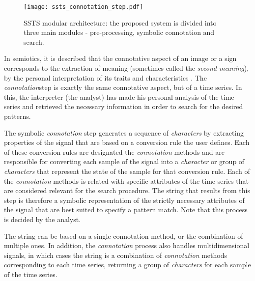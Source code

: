 \begin{figure}
\centering
\texttt{[image: ssts\_connotation\_step.pdf]}
\label{fig:ssts_intro}
\caption{SSTS modular architecture: the proposed system is divided into three main modules - pre-processing, symbolic connotation and search.}
\end{figure}

In semiotics, it is described that the connotative aspect of an image or a sign corresponds to the extraction of meaning (sometimes called the \textit{second meaning}), by the personal interpretation of its traits and characteristics \cite{connotation}. The \textit{connotation}step is exactly the same connotative aspect, but of a time series. In this, the interpreter (the analyst) has made his personal analysis of the time series and retrieved the necessary information in order to search for the desired patterns. 
\par
The symbolic \textit{connotation} step generates a sequence of \textit{characters} by extracting properties of the signal that are based on a conversion rule the user defines. Each of these conversion rules are designated the \textit{connotation} methods and are responsible for converting each sample of the signal into a \textit{character} or group of \textit{characters} that represent the state of the sample for that conversion rule. Each of the \textit{connotation} methods is related with specific attributes of the time series that are considered relevant for the search procedure. The string that results from this step is therefore a symbolic representation of the strictly necessary attributes of the signal that are best suited to specify a pattern match. Note that this process is decided by the analyst.
\par
The string can be based on a single connotation method, or the combination of multiple ones. In addition, the \textit{connotation} process also handles multidimensional signals, in which cases the string is a combination of \textit{connotation} methods corresponding to each time series, returning a group of \textit{characters} for each sample of the time series.
\par
